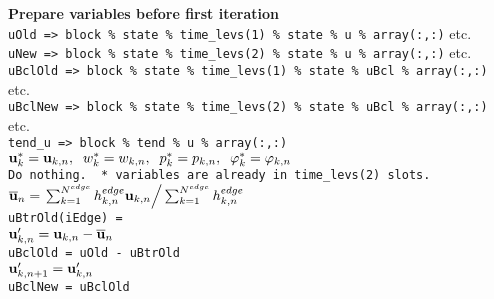 \documentclass[11pt]{report}
\begin{document}
{\bf Prepare variables before first iteration}\\
\verb|uOld => block % state % time_levs(1) % state % u % array(:,:)| etc.\\
\verb|uNew => block % state % time_levs(2) % state % u % array(:,:)| etc.\\
\verb|uBclOld => block % state % time_levs(1) % state % uBcl % array(:,:)| etc.\\
\verb|uBclNew => block % state % time_levs(2) % state % uBcl % array(:,:)| etc.\\
\verb|tend_u => block % tend % u % array(:,:)|\\
${\bf u}_k^*={\bf u}_{k,n},\;\;
w_k^*=w_{k,n},\;\;
p_k^*=p_{k,n}, \;\;
{\varphi}_k^* = {\varphi}_{k,n} $\\
\verb|Do nothing.  * variables are already in time_levs(2) slots.|\\
$\overline{\bf u}_n = \left. \sum_{k=1}^{N^{edge}} h_{k,n}^{edge} {\bf u}_{k,n}
\right/
\sum_{k=1}^{N^{edge}} h_{k,n}^{edge}$\\
\verb|uBtrOld(iEdge) = |\\
${\bf u}'_{k,n} = {\bf u}_{k,n} - \overline{\bf u}_n $\\
\verb|uBclOld = uOld - uBtrOld|\\
${\bf u}_{k,n+1}'={\bf u}_{k,n}' $\\
\verb|uBclNew = uBclOld|\\
\end{document}
